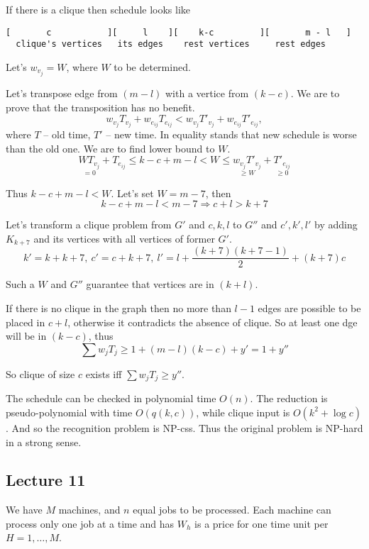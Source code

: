 \documentclass{amsart}
\begin{document}
If there is a clique then schedule looks like
\begin{verbatim}
[       c           ][     l    ][    k-c         ][       m - l   ]
  clique's vertices   its edges    rest vertices     rest edges
\end{verbatim}

Let's $w_{v_j}=W$, where $W$ to be determined.

Let's transpose edge from $(m-l)$ with a vertice from $(k-c)$.
We are to prove that the transposition has no benefit.
\[
  w_{v_j}T_{v_j} + w_{e_{ij}}T_{e_{ij}} <
    w_{v_j}T'_{v_j} + w_{e_{ij}}T'_{e_{ij}},
\]
where $T$ -- old time, $T'$ -- new time. In equality stands that
new schedule is worse than the old one. We are to find lower bound to $W$.
\[
  \underset{=0}
    {WT_{v_j}} +
  T_{e_{ij}} \leqslant k - c + m - l <
    W \leqslant
      \underset{\geqslant W}
        { w_{v_j} T'_{v_j} } +
      \underset{\geqslant 0}
        { T'_{e_{ij}} }
\]

Thus $k-c+m-l < W$. Let's set $W=m-7$, then
\[
  k - c + m - l < m - 7 \Rightarrow c + l > k + 7
\]

Let's transform a clique problem from $G'$ and $c,k,l$ to
$G''$ and $c',k',l'$ by adding $K_{k+7}$ and its vertices with
all vertices of former $G'$.
\[
  k' = k + k + 7,\ c' = c + k + 7,
  \ l' = l + \frac{(k+7)(k+7-1)}{2} + (k+7)c
\]

Such a $W$ and $G''$ guarantee that vertices are in $(k+l)$.

If there is no clique in the graph then no more than $l-1$ edges
are possible to be placed in $c+l$, otherwise it contradicts the absence
of clique. So at least one dge will be in $(k-c)$, thus
\[
  \sum w_jT_j \geqslant 1 + (m-l)(k-c) + y' = 1 + y''
\]

So clique of size $c$ exists iff $\sum w_jT_j \geqslant y''$.

The schedule can be checked in polynomial time $O(n)$.
The reduction is pseudo-polynomial with time $O(q(k,c))$, while
clique input is $O(k^2+ \log c)$. And so the recognition problem is NP-css.
Thus the original problem is NP-hard in a strong sense.

\subsection{Lecture 11}
We have $M$ machines, and $n$ equal jobs to be processed.
Each machine can process only one job at a time and has $W_h$ is a price
for one time unit per $H=1,\dots,M$.
\end{document}
